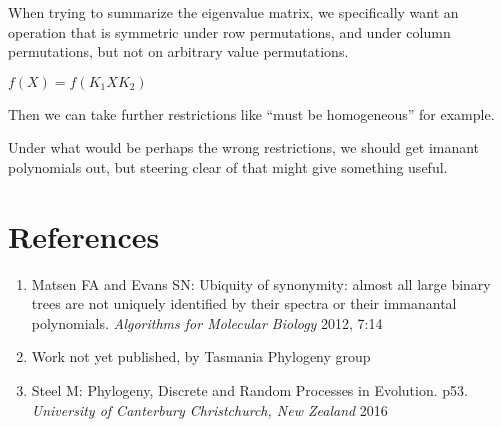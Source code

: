 \documentclass[10pt,a4paper]{report}
\begin{document}
When trying to summarize the eigenvalue matrix, we specifically want an
operation that is symmetric under row permutations, and under column
permutations, but not on arbitrary value permutations.

$f(X) = f(K_1XK_2)$

Then we can take further restrictions like ``must be homogeneous'' for example.

Under what would be perhaps the wrong restrictions, we should get imanant
polynomials out, but steering clear of that might give something useful.

\section{References}

\begin{enumerate}
	\item Matsen FA and Evans SN: Ubiquity of synonymity: almost all large
		binary trees are not uniquely identified by their spectra or their
		immanantal polynomials. \textit{Algorithms for Molecular Biology} 2012,
		7:14
	\item Work not yet published, by Tasmania Phylogeny group
	\item Steel M: Phylogeny, Discrete and Random Processes in Evolution. p53.
		\textit{University of Canterbury Christchurch, New Zealand} 2016
\end{enumerate}
\end{document}
